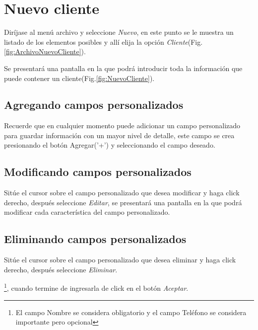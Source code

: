 \section{Nuevo cliente}
\label{sec:nuevoCliente}
Dir\'ijase al men\'u archivo y seleccione \emph{Nuevo}, en este punto se le muestra un listado de los elementos posibles y
all\'i elija la opci\'on \emph{Cliente}(Fig.\ref{fig:ArchivoNuevoCliente}). 
  

Se presentar\'a una pantalla en la que podr\'a introducir toda la informaci\'on
que puede contener un cliente(Fig.\ref{fig:NuevoCliente}). 
  

\subsection{Agregando campos personalizados}
\label{sec:agregarCamposCliente}
Recuerde que en cualquier momento puede adicionar un campo personalizado para guardar informaci\'on con un mayor nivel de detalle, este campo se crea presionando el bot\'on Agregar('+') y seleccionando el campo deseado.

\subsection{Modificando campos personalizados}
\label{sec:modificarCamposCliente}
Sit\'ue el cursor sobre el campo personalizado que desea modificar y haga click derecho, despu\'es seleccione \emph{Editar},
se presentar\'a una pantalla en la que podr\'a modificar cada caracter\'istica
del campo personalizado.

\subsection{Eliminando campos personalizados}
\label{sec:eliminarCamposCliente}
Sit\'ue el cursor sobre el campo personalizado que desea eliminar y haga click derecho, despu\'es seleccione \emph{Eliminar}.

\footnote{El campo Nombre se considera obligatorio y el campo Tel\'efono se
considera importante pero opcional},
cuando termine de ingresarla de click en el bot\'on \emph{Aceptar}.



